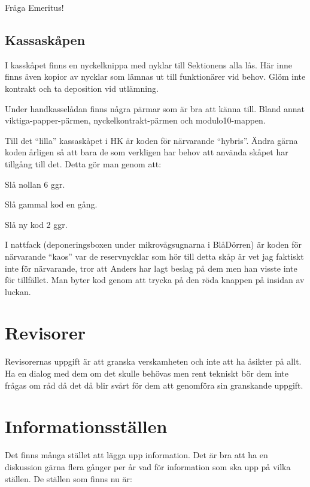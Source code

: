 \documentclass[10pt]{article}
\begin{document}
Fråga Emeritus!

\subsection{Kassaskåpen}

I kasskåpet finns en nyckelknippa med nyklar till Sektionens alla lås. Här inne finns även kopior av nycklar som lämnas ut till funktionärer vid behov. Glöm inte kontrakt och ta deposition vid utlämning.

Under handkasselådan finns några pärmar som är bra att känna till. Bland annat viktiga-papper-pärmen, nyckelkontrakt-pärmen och modulo10-mappen.

Till det ``lilla'' kassaskåpet i HK är koden för närvarande ``hybris''. Ändra gärna koden årligen så att bara de som verkligen har behov att använda skåpet har tillgång till det. Detta gör man genom att:

\begin{numplist}
\item Slå nollan 6 ggr.
\item Slå gammal kod en gång.
\item Slå ny kod 2 ggr.
\end{numplist}

I nattfack (deponeringsboxen under mikrovågsugnarna i BlåDörren) är koden för närvarande ``kaos'' var de reservnycklar som hör till detta skåp är vet jag faktiskt inte för närvarande, tror att Anders har lagt beslag på dem men han visste inte för tillfället. Man byter kod genom att trycka på den röda knappen på insidan av luckan.

\section{Revisorer}

Revisorernas uppgift är att granska verskamheten och inte att ha åsikter på allt. Ha en dialog med dem om det skulle behövas men rent tekniskt bör dem inte frågas om råd då det då blir svårt för dem att genomföra sin granskande uppgift.

\section{Informationsställen}

Det finns många stället att lägga upp information. Det är bra att ha en diskussion gärna flera gånger per år vad för information som ska upp på vilka ställen. De ställen som finns nu är:
\end{document}
